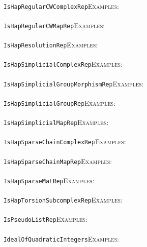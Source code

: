 \documentclass[a4paper,11pt]{report}
\begin{document}
{{ \\
 \texttt{IsHapRegularCWComplexRep}{\nobreakspace}{\nobreakspace}{\nobreakspace}{\nobreakspace}\textsc{Examples:} \\
 \\
 \texttt{IsHapRegularCWMapRep}{\nobreakspace}{\nobreakspace}{\nobreakspace}{\nobreakspace}\textsc{Examples:} \\
 \\
 \texttt{IsHapResolutionRep}{\nobreakspace}{\nobreakspace}{\nobreakspace}{\nobreakspace}\textsc{Examples:} \\
 \\
 \texttt{IsHapSimplicialComplexRep}{\nobreakspace}{\nobreakspace}{\nobreakspace}{\nobreakspace}\textsc{Examples:} \\
 \\
 \texttt{IsHapSimplicialGroupMorphismRep}{\nobreakspace}{\nobreakspace}{\nobreakspace}{\nobreakspace}\textsc{Examples:} \\
 \\
 \texttt{IsHapSimplicialGroupRep}{\nobreakspace}{\nobreakspace}{\nobreakspace}{\nobreakspace}\textsc{Examples:} \\
 \\
 \texttt{IsHapSimplicialMapRep}{\nobreakspace}{\nobreakspace}{\nobreakspace}{\nobreakspace}\textsc{Examples:} \\
 \\
 \texttt{IsHapSparseChainComplexRep}{\nobreakspace}{\nobreakspace}{\nobreakspace}{\nobreakspace}\textsc{Examples:} \\
 \\
 \texttt{IsHapSparseChainMapRep}{\nobreakspace}{\nobreakspace}{\nobreakspace}{\nobreakspace}\textsc{Examples:} \\
 \\
 \texttt{IsHapSparseMatRep}{\nobreakspace}{\nobreakspace}{\nobreakspace}{\nobreakspace}\textsc{Examples:} \\
 \\
 \texttt{IsHapTorsionSubcomplexRep}{\nobreakspace}{\nobreakspace}{\nobreakspace}{\nobreakspace}\textsc{Examples:} \\
 \\
 \texttt{IsPseudoListRep}{\nobreakspace}{\nobreakspace}{\nobreakspace}{\nobreakspace}\textsc{Examples:} \\
 \\
 \texttt{IdealOfQuadraticIntegers}{\nobreakspace}{\nobreakspace}{\nobreakspace}{\nobreakspace}\textsc{Examples:} \\
 \\
}}
\end{document}
